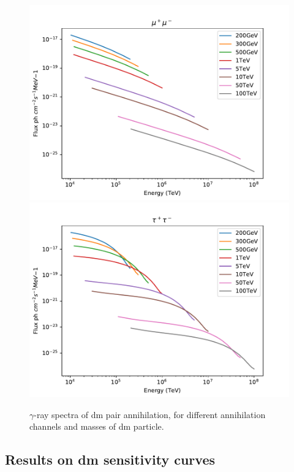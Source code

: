 \documentclass[main.tex]{subfiles}
\begin{document}
\begin{figure}
  \endminipage \\
  \includegraphics[width=1\textwidth]{Pictures/specMu.pdf}
  \endminipage
  \includegraphics[width=1\textwidth]{Pictures/specTau.pdf}
  \endminipage \\
  \caption{$\gamma$-ray spectra of \gls{dm} pair annihilation, for different annihilation channels and masses of \gls{dm} particle. }
  \label{fig:dmspec}
\end{figure}

\subsection{Results on \gls{dm} sensitivity curves}
\end{document}
